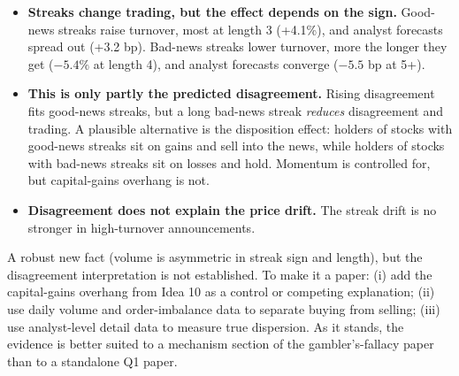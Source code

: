 \begin{itemize}
\item \textbf{Streaks change trading, but the effect depends on the sign.} Good-news streaks raise turnover, most at
  length 3 (+4.1\%), and analyst forecasts spread out (+3.2 bp). Bad-news streaks lower turnover, more the longer
  they get ($-5.4\%$ at length 4), and analyst forecasts converge ($-5.5$ bp at 5+).
\item \textbf{This is only partly the predicted disagreement.} Rising disagreement fits good-news streaks, but a
  long bad-news streak \emph{reduces} disagreement and trading. A plausible alternative is the disposition effect:
  holders of stocks with good-news streaks sit on gains and sell into the news, while holders of stocks with
  bad-news streaks sit on losses and hold. Momentum is controlled for, but capital-gains overhang is not.
\item \textbf{Disagreement does not explain the price drift.} The streak drift is no stronger in high-turnover
  announcements.
\end{itemize}

A robust new fact (volume is asymmetric in streak sign and length), but the disagreement interpretation is not
established. To make it a paper: (i) add the capital-gains overhang from Idea 10 as a control or competing
explanation; (ii) use daily volume and order-imbalance data to separate buying from selling; (iii) use
analyst-level detail data to measure true dispersion. As it stands, the evidence is better suited to a
mechanism section of the gambler's-fallacy paper than to a standalone Q1 paper.


